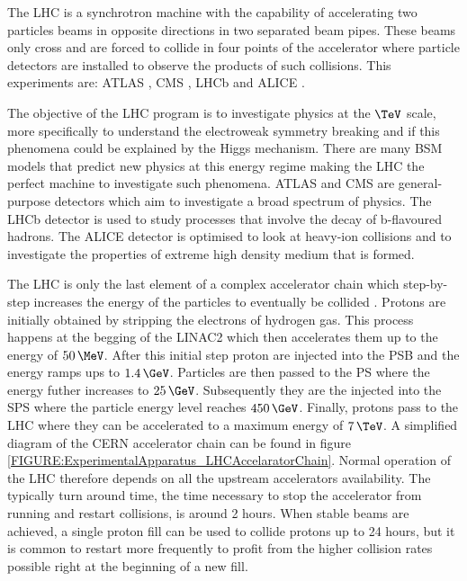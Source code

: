 The \gls{LHC} is a synchrotron machine with the capability of accelerating two particles beams in opposite directions in two separated beam pipes. These beams only cross and are forced to collide in four points of the accelerator where particle detectors are installed to observe the products of such collisions. This experiments are: \gls{ATLAS} \cite{ARTICLE:TheATLASExperiment}, \gls{CMS} \cite{ARTICLE:TheCMSExperiment}, \gls{LHCb} \cite{ARTICLE:TheLHCbExperiment} and \gls{ALICE} \cite{ARTICLE:TheALICEExperiment}.

The objective of the \gls{LHC} program is to investigate physics at the $\TeV$ scale, more specifically to understand the electroweak symmetry breaking and if this phenomena could be explained by the Higgs mechanism. There are many \gls{BSM} models that predict new physics at this energy regime making the \gls{LHC} the perfect machine to investigate such phenomena. \gls{ATLAS} and \gls{CMS} are general-purpose detectors which aim to investigate a broad spectrum of physics. The \gls{LHCb} detector is used to study processes that involve the decay of b-flavoured hadrons. The \gls{ALICE} detector is optimised to look at heavy-ion collisions and to investigate the properties of extreme high density medium that is formed.

The \gls{LHC} is only the last element of a complex accelerator chain which step-by-step increases the energy of the particles to eventually be collided \cite{ARTICLE:LHCMachine}. Protons are initially obtained by stripping the electrons of hydrogen gas. This process happens at the begging of the \gls{LINAC2} which then accelerates them up to the energy of $50\,\MeV$. After this initial step proton are injected into the \gls{PSB} and the energy ramps ups to $1.4\,\GeV$. Particles are then passed to the \gls{PS} where the energy futher increases to $25\,\GeV$. Subsequently they are the injected into the \gls{SPS} where the particle energy level reaches $450\,\GeV$. Finally, protons pass to the \gls{LHC} where they can be accelerated to a maximum energy of $7\,\TeV$. A simplified diagram of the \gls{CERN} accelerator chain can be found in figure \ref{FIGURE:ExperimentalApparatus_LHCAccelaratorChain}. 
Normal operation of the \gls{LHC} therefore depends on all the upstream accelerators availability. The typically turn around time, the time necessary to stop the accelerator from running and restart collisions, is around 2 hours. When stable beams are achieved, a single proton fill can be used to collide protons up to 24 hours, but it is common to restart more frequently to profit from the higher collision rates possible right at the beginning of a new fill.

